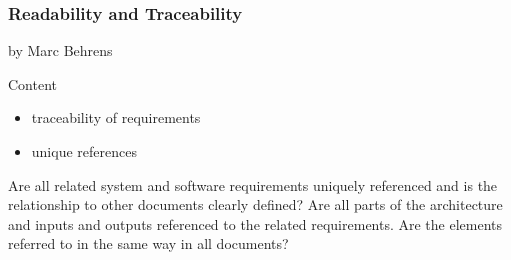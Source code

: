 \subsubsection{Readability and Traceability}

by Marc Behrens

Content
\begin{itemize}
\item traceability of requirements
\item unique references
\end{itemize}


Are all related system and software requirements uniquely referenced and is the relationship to other documents clearly defined?
Are all parts of the architecture and inputs and outputs referenced to the related requirements.
Are the elements referred to in the same way in all documents?